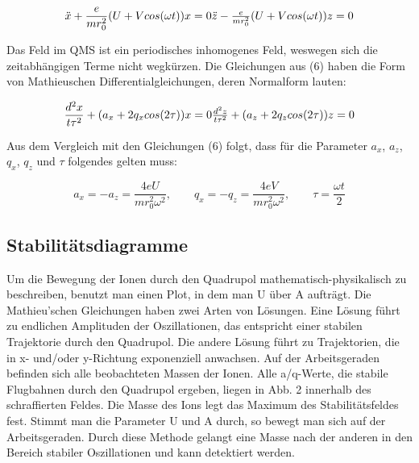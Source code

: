 \begin{equation}
\ddot{x} + \frac{e}{mr_{0}^{2}}(U+V cos (\omega t)) x = 0
$$\\$$
\ddot{z} - \frac{e}{mr_{0}^{2}}(U+V cos (\omega t)) z = 0
\end{equation}

Das Feld im QMS ist ein periodisches inhomogenes Feld, weswegen sich die zeitabhängigen Terme nicht wegkürzen. Die Gleichungen aus (6) haben die Form von Mathieuschen Differentialgleichungen, deren Normalform lauten:

\begin{equation}
\frac{d^{2}x}{t\tau^{2}}+(a_{x}+2q_{x}cos (2\tau)) x = 0
$$\\$$
\frac{d^{2}z}{t\tau^{2}}+(a_{z}+2q_{z}cos (2\tau)) z = 0
\end{equation}

Aus dem Vergleich mit den Gleichungen (6) folgt, dass für die Parameter $a_{x}$, $a_{z}$, $q_{x}$, $q_{z}$ und $\tau$ folgendes gelten muss:

\begin{equation}
a_{x} = -a_{z} = \frac{4eU}{mr_{0}^{2}\omega^{2}},\qquad q_{x}= -q_{z}= \frac{4eV}{mr_{0}^{2}\omega^{2}},\qquad \tau =\frac{\omega t}{2}
\end{equation}



\subsection{Stabilitätsdiagramme}
Um die Bewegung der Ionen durch den Quadrupol mathematisch-physikalisch zu beschreiben, benutzt man einen Plot, in dem man U über A aufträgt. Die Mathieu'schen Gleichungen haben zwei Arten von Lösungen. Eine Lösung führt zu endlichen Amplituden der Oszillationen, das entspricht einer stabilen Trajektorie durch den Quadrupol. Die andere Lösung führt zu Trajektorien, die in x- und/oder y-Richtung exponenziell anwachsen. Auf der Arbeitsgeraden befinden sich alle beobachteten Massen der Ionen. Alle a/q-Werte, die stabile Flugbahnen durch den Quadrupol ergeben, liegen in Abb. 2 innerhalb des schraffierten Feldes. Die Masse des Ions legt das Maximum des Stabilitätsfeldes fest. Stimmt man die Parameter U und A durch, so bewegt man sich auf der Arbeitsgeraden. Durch diese Methode gelangt eine Masse nach der anderen in den Bereich stabiler Oszillationen und kann detektiert werden.


